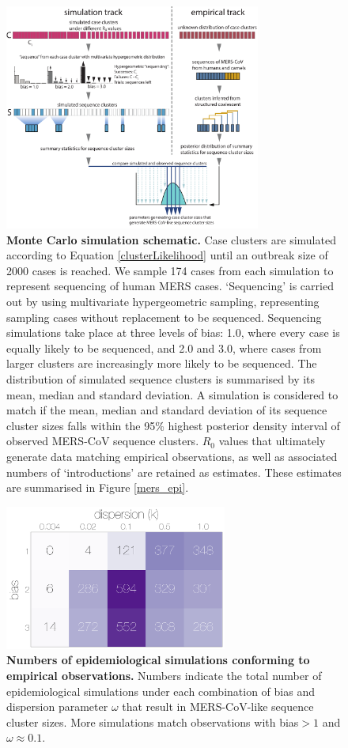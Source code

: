 \documentclass[11pt,oneside,letterpaper]{article}
\begin{document}
\begin{figure}[h]
\centering
	\includegraphics[width=0.75\textwidth]{figures/mers_mc_method.pdf}
	\caption{\textbf{Monte Carlo simulation schematic.}
Case clusters are simulated according to Equation \ref{clusterLikelihood} until an outbreak size of 2000 cases is reached.
We sample 174 cases from each simulation to represent sequencing of human MERS cases.
`Sequencing' is carried out by using multivariate hypergeometric sampling, representing sampling cases without replacement to be sequenced.
Sequencing simulations take place at three levels of bias: 1.0, where every case is equally likely to be sequenced, and 2.0 and 3.0, where cases from larger clusters are increasingly more likely to be sequenced.
The distribution of simulated sequence clusters is summarised by its mean, median and standard deviation.
A simulation is considered to match if the mean, median and standard deviation of its sequence cluster sizes falls within the 95\% highest posterior density interval of observed MERS-CoV sequence clusters.
$R_{0}$ values that ultimately generate data matching empirical observations, as well as associated numbers of `introductions' are retained as estimates.
These estimates are summarised in Figure \ref{mers_epi}.
	}
	\label{mc_method}
\end{figure}

\begin{figure}[h]
\centering
	\includegraphics[width=0.65\textwidth]{figures/mers_simMarginals.png}
	\caption{\textbf{Numbers of epidemiological simulations conforming to empirical observations.}
Numbers indicate the total number of epidemiological simulations under each combination of bias and dispersion parameter $\omega$ that result in MERS-CoV-like sequence cluster sizes.
More simulations match observations with bias$>1$ and $\omega \approx 0.1$.
	}
	\label{marginals}
\end{figure}
\end{document}
